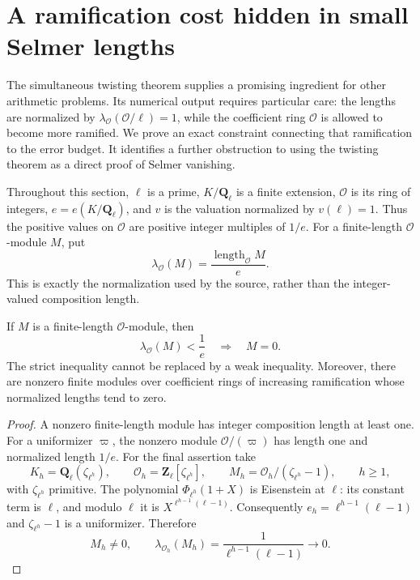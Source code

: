 \section{A ramification cost hidden in small Selmer lengths}
\label{sec:ramification-budget}

The simultaneous twisting theorem supplies a promising ingredient for other
arithmetic problems. Its numerical output requires particular care: the
lengths are normalized by $\lambda_{\mathcal O}(\mathcal O/\ell)=1$,
while the coefficient ring $\mathcal O$ is allowed to become more ramified.
We prove an exact constraint connecting that ramification to the error
budget. It identifies a further obstruction to using the twisting theorem
as a direct proof of Selmer vanishing.

Throughout this section, $\ell$ is a prime, $K/\mathbf Q_\ell$ is a finite
extension, $\mathcal O$ is its ring of integers, $e=e(K/\mathbf Q_\ell)$,
and $v$ is the valuation normalized by $v(\ell)=1$. Thus the positive
values on $\mathcal O$ are positive integer multiples of $1/e$.
For a finite-length $\mathcal O$-module $M$, put
\[
 \lambda_{\mathcal O}(M)
   =\frac{\operatorname{length}_{\mathcal O}M}{e}.
\]
This is exactly the normalization used by the source, rather than the
integer-valued composition length.

\begin{proposition}
\label{prop:length-threshold}
If $M$ is a finite-length $\mathcal O$-module, then
\[
 \lambda_{\mathcal O}(M)<\frac1e\quad\Longrightarrow\quad M=0.
\]
The strict inequality cannot be replaced by a weak inequality. Moreover,
there are nonzero finite modules over coefficient rings of increasing
ramification whose normalized lengths tend to zero.
\end{proposition}

\begin{proof}
A nonzero finite-length module has integer composition length at least one.
For a uniformizer $\varpi$, the nonzero module
$\mathcal O/(\varpi)$ has length one and normalized length $1/e$.
For the final assertion take
\[
 K_h=\mathbf Q_\ell(\zeta_{\ell^h}),\qquad
 \mathcal O_h=\mathbf Z_\ell[\zeta_{\ell^h}],\qquad
 M_h=\mathcal O_h/(\zeta_{\ell^h}-1),\qquad h\geq1,
\]
with $\zeta_{\ell^h}$ primitive. The polynomial
$\Phi_{\ell^h}(1+X)$ is Eisenstein at $\ell$: its constant term is $\ell$,
and modulo $\ell$ it is $X^{\ell^{h-1}(\ell-1)}$.
Consequently $e_h=\ell^{h-1}(\ell-1)$ and $\zeta_{\ell^h}-1$ is a
uniformizer. Therefore
\[
  M_h\ne0,\qquad
  \lambda_{\mathcal O_h}(M_h)=\frac{1}{\ell^{h-1}(\ell-1)}
       \longrightarrow0.
\]
\end{proof}

